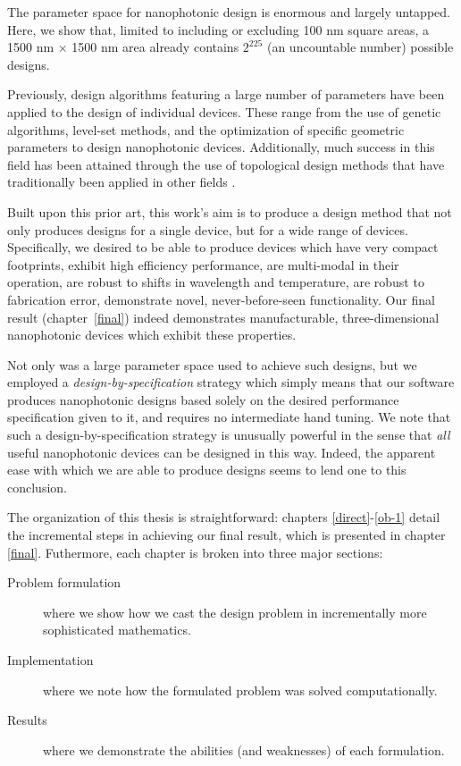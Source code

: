     {The parameter space for nanophotonic design is enormous and largely untapped.
    Here, we show that, 
        limited to including or excluding 100 nm square areas,
        a 1500 nm $\times$ 1500 nm area already contains $2^{225}$ 
        (an uncountable number) possible designs.}
  
Previously, design algorithms featuring a large number of parameters
    have been applied to the design of individual devices.
These range from the use of genetic algorithms\cite{lipson},
    level-set methods\cite{yablo}, 
    and the optimization of specific geometric parameters\cite{levi,johnson}
    to design nanophotonic devices.
Additionally, much success in this field has been attained\cite{sigmund1}
    through the use of topological design methods that
    have traditionally been applied in other fields \cite{jameson,bendsoe}.

Built upon this prior art,
    this work's aim is to produce a design method 
    that not only produces designs for a single device,
    but for a wide range of devices.
Specifically,
    we desired to be able to produce devices which
    \BI have very compact footprints,
    \I  exhibit high efficiency performance,
    \I  are multi-modal in their operation,
    \I  are robust to shifts in wavelength and temperature,
    \I  are robust to fabrication error,
    \I  demonstrate novel, never-before-seen functionality. \EI
Our final result (chapter~\ref{final}) indeed demonstrates
    manufacturable, three-dimensional nanophotonic devices which
    exhibit these properties.

Not only was a large parameter space used to achieve such designs,
    but we employed a \emph{design-by-specification} strategy
    which simply means that our software produces nanophotonic designs
    based solely on the desired performance specification given to it,
    and requires no intermediate hand tuning.
We note that such a design-by-specification strategy
    is unusually powerful in the sense that \emph{all} useful nanophotonic devices
    can be designed in this way.
Indeed, the apparent ease with which we are able to produce designs seems
    to lend one to this conclusion.

The organization of this thesis is straightforward: 
    chapters \ref{direct}-\ref{ob-1} detail the incremental steps in achieving
    our final result, which is presented in chapter \ref{final}.
Futhermore, each chapter is broken into three major sections:
    \begin{description}
    \item[Problem formulation] where we show how we cast the design problem
        in incrementally more sophisticated mathematics.
    \item[Implementation] where we note how the formulated problem 
        was solved computationally.
    \item[Results] where we demonstrate the abilities (and weaknesses)
        of each formulation.
    \end{description}

